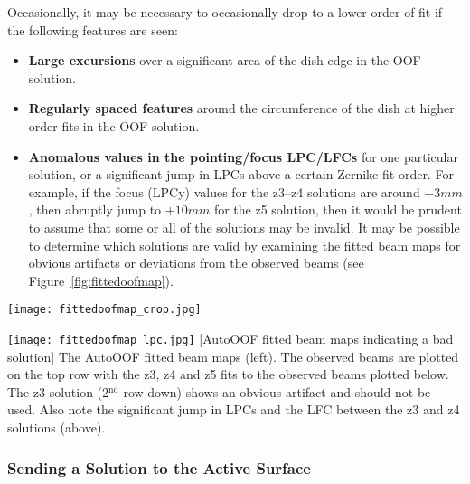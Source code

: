 Occasionally, it may be necessary to occasionally drop to a lower order of fit if the
following features are seen:

\begin{itemize}[leftmargin=*]
\item {\bf Large excursions} over a significant area of the dish edge in the \gls{OOF}
solution.
\item {\bf Regularly spaced features} around the circumference of the dish at higher
order fits in the \gls{OOF} solution.
\item {\bf Anomalous values in the pointing/focus \gls{LPC}/\glspl{LFC}} for one
particular solution, or a significant jump in \glspl{LPC} above a certain Zernike fit
order.  For example, if the focus (LPCy) values for the z3--z4 solutions are around $-3mm$,
then abruptly jump to $+10mm$ for the z5 solution, then it would be prudent to assume that
some or all of the solutions may be invalid.  It may be possible to determine which solutions
are valid by examining the fitted beam maps for obvious artifacts or deviations from the
observed beams (see Figure~\ref{fig:fittedoofmap}).
\end{itemize}

\newpage

\begin{center}
\noindent\begin{minipage}[t]{0.48\linewidth}
\vspace{0pt}
\texttt{[image: fittedoofmap\_crop.jpg]}
\end{minipage}
\hspace{0.025\linewidth}
\begin{minipage}[t]{0.36\linewidth}
\vspace{0pt}
\texttt{[image: fittedoofmap\_lpc.jpg]}
\setlength{\abovecaptionskip}{0pt}\setlength{\belowcaptionskip}{0pt}
[AutoOOF fitted beam maps indicating a bad solution]
{The AutoOOF fitted beam maps (left). The observed beams are plotted on the top row
with the z3, z4 and z5 fits to the observed beams plotted below. The z3
solution (2$^{\text{nd}}$ row down) shows an obvious artifact and should not be used.
Also note the significant jump in \glspl{LPC} and the \gls{LFC} between the z3 and
z4 solutions (above).
\label{fig:fittedoofmap}}
\end{minipage}
\end{center}

\vspace{-2.5mm}
\subsubsection{Sending a Solution to the Active Surface}
\vspace{-2.5mm}

